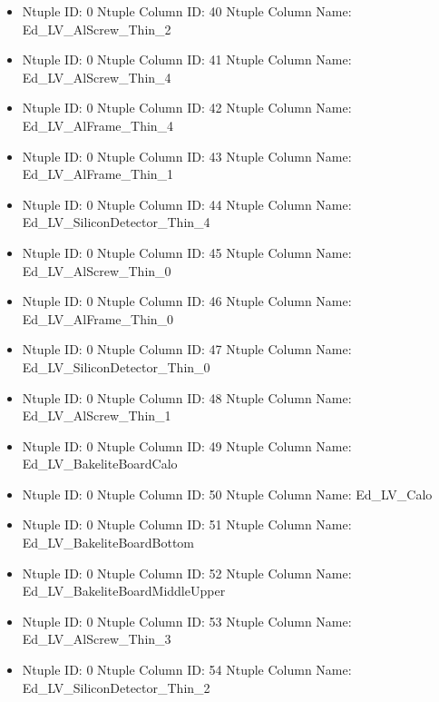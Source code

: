 \documentclass[8pt]{beamer}
\begin{document}
\begin{frame}
\begin{itemize}
        \item Ntuple ID: 0 Ntuple Column ID: 40 Ntuple Column Name: Ed\_LV\_AlScrew\_Thin\_2
        
        \item Ntuple ID: 0 Ntuple Column ID: 41 Ntuple Column Name: Ed\_LV\_AlScrew\_Thin\_4
        
        \item Ntuple ID: 0 Ntuple Column ID: 42 Ntuple Column Name: Ed\_LV\_AlFrame\_Thin\_4
        
        \item Ntuple ID: 0 Ntuple Column ID: 43 Ntuple Column Name: Ed\_LV\_AlFrame\_Thin\_1
        
        \item Ntuple ID: 0 Ntuple Column ID: 44 Ntuple Column Name: Ed\_LV\_SiliconDetector\_Thin\_4
        
        \item Ntuple ID: 0 Ntuple Column ID: 45 Ntuple Column Name: Ed\_LV\_AlScrew\_Thin\_0
        
        \item Ntuple ID: 0 Ntuple Column ID: 46 Ntuple Column Name: Ed\_LV\_AlFrame\_Thin\_0
        
        \item Ntuple ID: 0 Ntuple Column ID: 47 Ntuple Column Name: Ed\_LV\_SiliconDetector\_Thin\_0
        
        \item Ntuple ID: 0 Ntuple Column ID: 48 Ntuple Column Name: Ed\_LV\_AlScrew\_Thin\_1
        
        \item Ntuple ID: 0 Ntuple Column ID: 49 Ntuple Column Name: Ed\_LV\_BakeliteBoardCalo
        
        \item Ntuple ID: 0 Ntuple Column ID: 50 Ntuple Column Name: Ed\_LV\_Calo
        
        \item Ntuple ID: 0 Ntuple Column ID: 51 Ntuple Column Name: Ed\_LV\_BakeliteBoardBottom
        
        \item Ntuple ID: 0 Ntuple Column ID: 52 Ntuple Column Name: Ed\_LV\_BakeliteBoardMiddleUpper
        
        \item Ntuple ID: 0 Ntuple Column ID: 53 Ntuple Column Name: Ed\_LV\_AlScrew\_Thin\_3
        
        \item Ntuple ID: 0 Ntuple Column ID: 54 Ntuple Column Name: Ed\_LV\_SiliconDetector\_Thin\_2
        

\end{itemize}
\end{frame}
\end{document}

